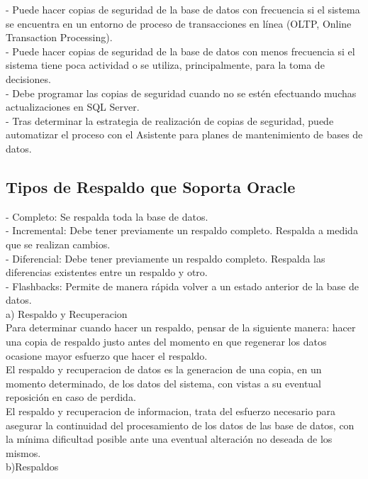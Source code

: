 \documentclass[12pt,letterpaper]{article}
\begin{document}
- Puede hacer copias de seguridad de la base de datos con frecuencia si el sistema se encuentra en un entorno de proceso de transacciones en línea (OLTP, Online Transaction Processing). \\
- Puede hacer copias de seguridad de la base de datos con menos frecuencia si el sistema tiene poca actividad o se utiliza, principalmente, para la toma de decisiones. \\
- Debe programar las copias de seguridad cuando no se estén efectuando muchas actualizaciones en SQL Server. \\
- Tras determinar la estrategia de realización de copias de seguridad, puede automatizar el proceso con el Asistente para planes de mantenimiento de bases de datos. \\

\subsection{Tipos de Respaldo que Soporta Oracle}
- Completo: Se respalda toda la base de datos. \\
- Incremental: Debe tener previamente un respaldo completo. Respalda a medida que se realizan cambios. \\
- Diferencial: Debe tener previamente un respaldo completo. Respalda las diferencias existentes entre un respaldo y otro. \\
- Flashbacks: Permite de manera rápida volver a un estado anterior de la base de datos. \\
a) Respaldo y Recuperacion \\

Para determinar cuando hacer un respaldo, pensar de la siguiente manera: hacer una copia de respaldo justo antes del momento en que regenerar los datos ocasione mayor esfuerzo que hacer el respaldo.\\
El respaldo y recuperacion de datos es la generacion de una copia, en un momento determinado, de los datos del sistema, con vistas a su eventual reposición en caso de perdida. \\

El respaldo y recuperacion de informacion, trata del esfuerzo necesario para asegurar la continuidad del procesamiento de los datos de las base de datos, con la mínima dificultad posible ante una eventual alteración no deseada de los mismos. \\

b)Respaldos \\
\end{document}
